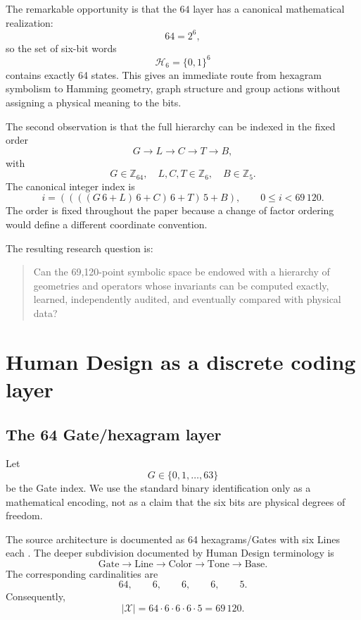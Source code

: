 \documentclass[11pt,a4paper]{article}
\numberwithin{equation}{section}
\newcommand{\Z}{\mathbb{Z}}
\newcommand{\HH}{\mathcal{H}}
\newcommand{\XX}{\mathcal{X}}
\begin{document}
The remarkable opportunity is that the $64$ layer has a canonical mathematical realization:
\[
64=2^6,
\]
so the set of six-bit words
\[
\HH_6=\{0,1\}^6
\]
contains exactly 64 states. This gives an immediate route from hexagram symbolism to Hamming geometry, graph structure and group actions without assigning a physical meaning to the bits.

The second observation is that the full hierarchy can be indexed in the fixed order
\[
G\rightarrow L\rightarrow C\rightarrow T\rightarrow B,
\]
with
\[
G\in\Z_{64},\quad L,C,T\in\Z_6,\quad B\in\Z_5.
\]
The canonical integer index is
\begin{equation}
 i=((((G\,6+L)\,6+C)\,6+T)\,5+B),
 \qquad 0\le i<69\,120.
\label{eq:canonical-index}
\end{equation}
The order is fixed throughout the paper because a change of factor ordering would define a different coordinate convention.

The resulting research question is:
\begin{quote}
Can the 69,120-point symbolic space be endowed with a hierarchy of geometries and operators whose invariants can be computed exactly, learned, independently audited, and eventually compared with physical data?
\end{quote}

\section{Human Design as a discrete coding layer}
\label{sec:HD}

\subsection{The 64 Gate/hexagram layer}

Let
\[
G\in\{0,1,\dots,63\}
\]
be the Gate index. We use the standard binary identification only as a mathematical encoding, not as a claim that the six bits are physical degrees of freedom.

The source architecture is documented as 64 hexagrams/Gates with six Lines each \citep{JovianArchiveGates2026}. The deeper subdivision documented by Human Design terminology is
\[
\text{Gate}\rightarrow\text{Line}\rightarrow\text{Color}\rightarrow\text{Tone}\rightarrow\text{Base}.
\]
The corresponding cardinalities are
\[
64,\qquad 6,\qquad 6,\qquad 6,\qquad 5.
\]
Consequently,
\begin{equation}
|\XX|=64\cdot6\cdot6\cdot6\cdot5=69\,120.
\label{eq:69120}
\end{equation}
\end{document}
